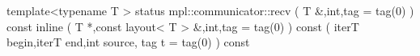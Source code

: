 template<typename T >
status mpl::communicator::recv
   ( T &,int,tag = tag(0) ) const inline
   ( T *,const layout< T > &,int,tag = tag(0) ) const
   ( iterT  begin,iterT  end,int  source, tag  t = tag(0) ) const
